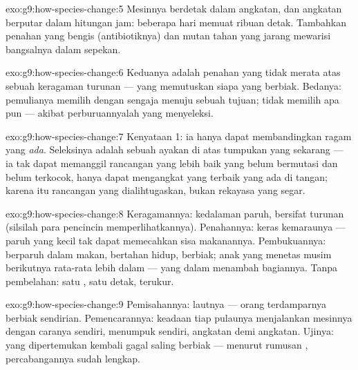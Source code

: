 \begin{solution}{exo:g9:how-species-change:5}
Mesinnya berdetak dalam angkatan, dan angkatan 
berputar dalam hitungan jam: beberapa hari memuat ribuan
detak. Tambahkan penahan yang bengis (antibiotiknya) dan
mutan tahan yang jarang mewarisi bangsalnya dalam sepekan.
\end{solution}

\begin{solution}{exo:g9:how-species-change:6}
Keduanya adalah penahan yang tidak merata atas sebuah
keragaman turunan --- yang memutuskan siapa yang berbiak.
Bedanya: pemulianya memilih dengan sengaja menuju sebuah
tujuan;  tidak memilih apa pun --- akibat
perburuannyalah yang menyeleksi.
\end{solution}

\begin{solution}{exo:g9:how-species-change:7}
Kenyataan 1: ia hanya dapat membandingkan ragam yang
\emph{ada}. Seleksinya adalah sebuah ayakan di atas tumpukan
yang sekarang --- ia tak dapat memanggil rancangan yang lebih
baik yang belum bermutasi dan belum terkocok, hanya dapat
mengangkat yang terbaik yang ada di tangan; karena itu
rancangan  yang dialihtugaskan, bukan rekayasa
yang segar.
\end{solution}

\begin{solution}{exo:g9:how-species-change:8}
Keragamannya: kedalaman paruh, bersifat turunan (silsilah
para pencincin memperlihatkannya). Penahannya:  keras
kemaraunya --- paruh yang kecil tak dapat memecahkan sisa
makanannya. Pembukuannya:  berparuh dalam makan,
bertahan hidup, berbiak; anak yang menetas musim berikutnya
rata-rata lebih dalam ---  yang dalam menambah bagiannya.
Tanpa pembelahan: satu , satu detak, terukur.
\end{solution}

\begin{solution}{exo:g9:how-species-change:9}
Pemisahannya: lautnya --- orang terdamparnya berbiak
sendirian. Pemencarannya: keadaan tiap pulaunya menjalankan
mesinnya dengan caranya sendiri, menumpuk  sendiri,
angkatan demi angkatan. Ujinya:  yang dipertemukan
kembali gagal saling berbiak --- menurut rumusan ,
percabangannya sudah lengkap.
\end{solution}

